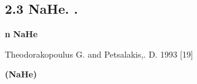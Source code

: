 \documentclass[a4paper]{article}
\begin{document}
\subsection[2.3 {\CYRZ}{\cyrn}{\cyra}{\cyrch}{\cyre}{\cyrn}{\cyri}{\cyrya} {\cyrs}{\cyri}{\cyrl}
{\cyro}{\cyrs}{\cyrc}{\cyri}{\cyrl}{\cyrl}{\cyrya}{\cyrt}{\cyro}{\cyrr}{\cyro}{\cyrv} {\cyrd}{\cyrl}{\cyrya}
{\cyrm}{\cyro}{\cyrl}{\cyre}{\cyrk}{\cyru}{\cyrl}{\cyrery} NaHe.
{\CYRZ}{\cyra}{\cyrp}{\cyrr}{\cyre}{\cyrshch}{\cyre}{\cyrn}{\cyrn}{\cyrery}{\cyre}
{\cyrp}{\cyre}{\cyrr}{\cyre}{\cyrh}{\cyro}{\cyrd}{\cyrery}.]{2.3
{\CYRZ}{\cyrn}{\cyra}{\cyrch}{\cyre}{\cyrn}{\cyri}{\cyrya} {\cyrs}{\cyri}{\cyrl}
{\cyro}{\cyrs}{\cyrc}{\cyri}{\cyrl}{\cyrl}{\cyrya}{\cyrt}{\cyro}{\cyrr}{\cyro}{\cyrv} {\cyrd}{\cyrl}{\cyrya}
{\cyrm}{\cyro}{\cyrl}{\cyre}{\cyrk}{\cyru}{\cyrl}{\cyrery} \foreignlanguage{english}{NaHe}.
{\CYRZ}{\cyra}{\cyrp}{\cyrr}{\cyre}{\cyrshch}{\cyre}{\cyrn}{\cyrn}{\cyrery}{\cyre}
{\cyrp}{\cyre}{\cyrr}{\cyre}{\cyrh}{\cyro}{\cyrd}{\cyrery}.}
\hypertarget{RefHeading4701463868395}{}{\centering
\textbf{{\CYRZ}{\cyra}{\cyrv}{\cyri}{\cyrs}{\cyri}{\cyrm}{\cyro}{\cyrs}{\cyrt}{\cyrsftsn}
{\cyrk}{\cyrv}{\cyra}{\cyrn}{\cyrt}{\cyro}{\cyrv}{\cyro}{\cyrg}{\cyro}
{\cyrd}{\cyre}{\cyrf}{\cyre}{\cyrk}{\cyrt}{\cyra} {\cyro}{\cyrt} }\foreignlanguage{english}{\textbf{n}}\textbf{
{\cyrd}{\cyrl}{\cyrya} }\foreignlanguage{english}{\textbf{NaHe}}
\par}

{\CYRK}{\cyrv}{\cyra}{\cyrn}{\cyrt}{\cyro}{\cyrv}{\cyrery}{\cyre} {\cyrd}{\cyre}{\cyrf}{\cyre}{\cyrk}{\cyrt}{\cyrery}
{\cyrp}{\cyrr}{\cyri}{\cyrv}{\cyre}{\cyrd}{\cyre}{\cyrn}{\cyrery} {\cyrp}{\cyro}
{\cyrs}{\cyrt}{\cyra}{\cyrt}{\cyrsftsn}{\cyre} T\foreignlanguage{english}{heodorakopoulus}
\foreignlanguage{english}{G}. \foreignlanguage{english}{and} \foreignlanguage{english}{Petsalakis},.
\foreignlanguage{english}{D.} 1993\foreignlanguage{english}{ }{\cyrg}{\cyro}{\cyrd}{\cyra}
\foreignlanguage{english}{[19]}


\bigskip

{\centering
\textbf{{\CYRS}{\cyri}{\cyrl}{\cyrery}
{\cyro}{\cyrs}{\cyrc}{\cyri}{\cyrl}{\cyrl}{\cyrya}{\cyrt}{\cyro}{\cyrr}{\cyro}{\cyrv} (NaHe)}
\par}
\end{document}
